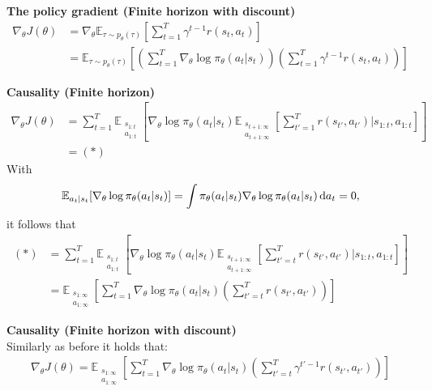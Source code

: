 \documentclass[a4paper, fontsize=8pt, landscape, DIV=1]{scrartcl}
\begin{document}
\begin{multicols*}{3}
\textbf{The policy gradient (Finite horizon with discount)}
\begin{align*}
\nabla_{\theta}J(\theta)&=\nabla_{\theta}\mathbb{E}_{\tau\sim p_{\theta}(\tau)}[\sum\limits_{t=1}^{T}\gamma^{t-1}r(s_t,a_t)] \\
&=\mathbb{E}_{\tau\sim p_{\theta}(\tau)}[\left(\sum\limits_{t=1}^{T}\nabla_{\theta}\log\pi_{\theta}(a_t|s_t)\right)\left(\sum\limits_{t=1}^{T}\gamma^{t-1}r(s_t,a_t)\right)]
\end{align*}

\textbf{Causality (Finite horizon)}\\[3pt]
\begin{align*}
\nabla_{\theta}J(\theta)&=\sum\limits_{t=1}^{T}\mathbb{E}_{\substack{s_{1:t}\\a_{1:t}}}\left[\nabla_{\theta}\log\pi_{\theta}(a_t|s_t)\mathbb{E}_{\substack{s_{t+1:\infty}\\a_{t+1:\infty}}}\left[\sum\limits_{t'=1}^{T}r(s_{t'},a_{t'})\bigg\rvert s_{1:t},a_{1:t}\right]\right] \\
&=(*)
\end{align*}
With
\begin{equation*}
\mathbb{E}_{a_t|s_t}[\nabla_{\theta}\log\pi_{\theta}(a_t|s_t)]=\int\pi_\theta(a_t|s_t)\nabla_{\theta}\log\pi_{\theta}(a_t|s_t)\dif a_t=0,
\end{equation*}
it follows that
\begin{align*}
(*)&=\sum\limits_{t=1}^{T}\mathbb{E}_{\substack{s_{1:t}\\a_{1:t}}}\left[\nabla_{\theta}\log\pi_{\theta}(a_t|s_t)\mathbb{E}_{\substack{s_{t+1:\infty}\\a_{t+1:\infty}}}\left[\sum\limits_{t'=t}^{T}r(s_{t'},a_{t'})\bigg\rvert s_{1:t},a_{1:t}\right]\right] \\
&=\mathbb{E}_{\substack{s_{1:\infty}\\a_{1:\infty}}}\left[\sum\limits_{t=1}^{T}\nabla_{\theta}\log\pi_{\theta}(a_t|s_t)\left(\sum\limits_{t'=t}^{T}r(s_{t'},a_{t'})\right)\right]
\end{align*}

\textbf{Causality (Finite horizon with discount)}\\[3pt]
Similarly as before it holds that:
\begin{align*}
\nabla_{\theta}J(\theta)=\mathbb{E}_{\substack{s_{1:\infty}\\a_{1:\infty}}}\left[\sum\limits_{t=1}^{T}\nabla_{\theta}\log\pi_{\theta}(a_t|s_t)\left(\sum\limits_{t'=t}^{T}\gamma^{t'-1}r(s_{t'},a_{t'})\right)\right]
\end{align*}


\end{multicols*}
\end{document}
